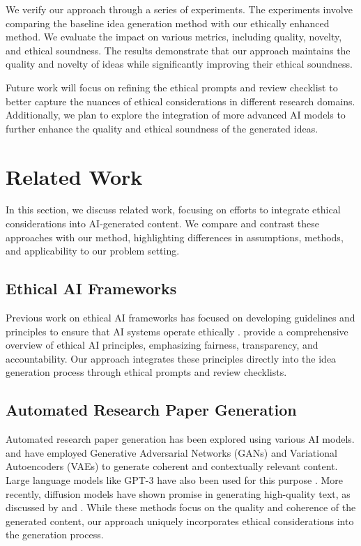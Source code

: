 \documentclass{article} %
\begin{document}
We verify our approach through a series of experiments. The experiments involve comparing the baseline idea generation method with our ethically enhanced method. We evaluate the impact on various metrics, including quality, novelty, and ethical soundness. The results demonstrate that our approach maintains the quality and novelty of ideas while significantly improving their ethical soundness.

Future work will focus on refining the ethical prompts and review checklist to better capture the nuances of ethical considerations in different research domains. Additionally, we plan to explore the integration of more advanced AI models to further enhance the quality and ethical soundness of the generated ideas.

\section{Related Work}
\label{sec:related}

In this section, we discuss related work, focusing on efforts to integrate ethical considerations into AI-generated content. We compare and contrast these approaches with our method, highlighting differences in assumptions, methods, and applicability to our problem setting.

\subsection{Ethical AI Frameworks}
Previous work on ethical AI frameworks has focused on developing guidelines and principles to ensure that AI systems operate ethically \citep{Kuppler2022FromFP, Akinrinola2024NavigatingAR}. \citet{goodfellow2016deep} provide a comprehensive overview of ethical AI principles, emphasizing fairness, transparency, and accountability. Our approach integrates these principles directly into the idea generation process through ethical prompts and review checklists.

\subsection{Automated Research Paper Generation}
Automated research paper generation has been explored using various AI models. \citet{gan} and \citet{vae} have employed Generative Adversarial Networks (GANs) and Variational Autoencoders (VAEs) to generate coherent and contextually relevant content. Large language models like GPT-3 have also been used for this purpose \citep{Kalyan2023ASO}. More recently, diffusion models have shown promise in generating high-quality text, as discussed by \citet{ddpm} and \citet{edm}. While these methods focus on the quality and coherence of the generated content, our approach uniquely incorporates ethical considerations into the generation process.
\end{document}
